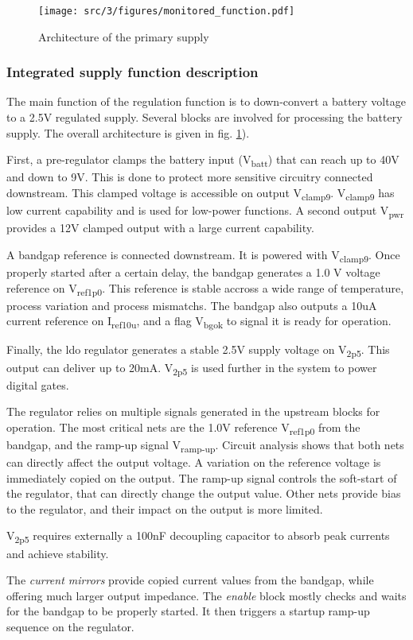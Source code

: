 \begin{figure}[!h]
  \centering
  \texttt{[image: src/3/figures/monitored\_function.pdf]}
  \caption{Architecture of the primary supply}
  \label{fig:monitored_function}
\end{figure}


\subsubsection{Integrated supply function description}
\label{sec:supply-desc}

The main function of the regulation function is to down-convert a battery voltage to a 2.5V regulated supply.
Several blocks are involved for processing the battery supply.
The overall architecture is given in fig. \ref{fig:monitored_function}).

First, a pre-regulator clamps the battery input (V\textsubscript{batt}) that can reach up to 40V and down to 9V.
This is done to protect more sensitive circuitry connected downstream.
This clamped voltage is accessible on output V\textsubscript{clamp9}.
V\textsubscript{clamp9} has low current capability and is used for low-power functions.
A second output V\textsubscript{pwr} provides a 12V clamped output with a large current capability.

A bandgap reference is connected downstream.
It is powered with V\textsubscript{clamp9}.
Once properly started after a certain delay, the bandgap generates a 1.0 V voltage reference on V\textsubscript{ref1p0}.
This reference is stable accross a wide range of temperature, process variation and process mismatchs.
The bandgap also outputs a 10uA current reference on I\textsubscript{ref10u}, and a flag V\textsubscript{bgok} to signal it is ready for operation.

Finally, the \gls{ldo} regulator generates a stable 2.5V supply voltage on V\textsubscript{2p5}.
This output can deliver up to 20mA.
V\textsubscript{2p5} is used further in the system to power digital gates.

The regulator relies on multiple signals generated in the upstream blocks for operation.
The most critical nets are the 1.0V reference V\textsubscript{ref1p0} from the bandgap, and the ramp-up signal V\textsubscript{ramp-up}.
Circuit analysis shows that both nets can directly affect the output voltage.
A variation on the reference voltage is immediately copied on the output.
The ramp-up signal controls the soft-start of the regulator, that can directly change the output value.
Other nets provide bias to the regulator, and their impact on the output is more limited.

V\textsubscript{2p5} requires externally a 100nF decoupling capacitor to absorb peak currents and achieve stability.

The \textit{current mirrors} provide copied current values from the bandgap, while offering much larger output impedance.
The \textit{enable} block mostly checks and waits for the bandgap to be properly started.
It then triggers a startup ramp-up sequence on the regulator.
